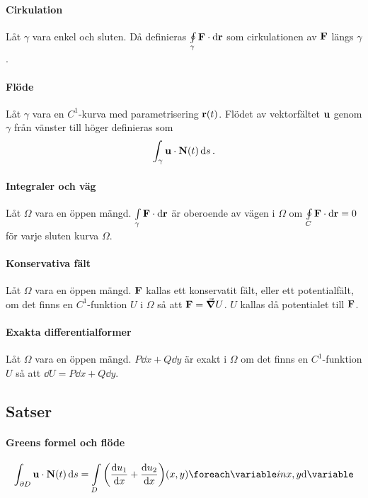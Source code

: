 \paragraph{Cirkulation}
Låt $\gamma$ vara enkel och sluten. Då definieras $\cint[c]{\gamma}{\vect{F}}{\vect{r}}$ som cirkulationen av $\vect{F}$ längs $\gamma$.

\paragraph{Flöde}
Låt $\gamma$ vara en $C^1$-kurva med parametrisering $\vect{r}(t)$. Flödet av vektorfältet $\vect{u}$ genom $\gamma$ från vänster till höger definieras som
\begin{align*}
	\int_{\gamma}\vect{u}\cdot\vect{N}(t)\dd{s}.
\end{align*}

\paragraph{Integraler och väg}
Låt $\Omega$ vara en öppen mängd. $\cint{\gamma}{\vect{F}}{\vect{r}}$ är oberoende av vägen i $\Omega$ om $\cint[c]{C}{\vect{F}}{\vect{r}} = 0$ för varje sluten kurva $\Omega$.

\paragraph{Konservativa fält}
Låt $\Omega$ vara en öppen mängd. $\vect{F}$ kallas ett konservatit fält, eller ett potentialfält, om det finns en $C^1$-funktion $U$ i $\Omega$ så att $\vect{F} = \grad{U}$. $U$ kallas då potentialet till $\vect{F}$.

\paragraph{Exakta differentialformer}
Låt $\Omega$ vara en öppen mängd. $P\dd{x} + Q\dd{y}$ är exakt i $\Omega$ om det finns en $C^1$-funktion $U$ så att $\dd{U} = P\dd{x} + Q\dd{y}$.

\subsection{Satser}

\paragraph{Greens formel och flöde}
\begin{align*}
	\int_{\bound{D}}\vect{u}\cdot\vect{N}(t)\dd{s} = \inteval{D}{\left(\dv{u_1}{x} + \dv{u_2}{x}\right)}{{x, y}}
\end{align*}

